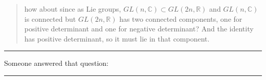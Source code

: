\documentclass{article}
\numberwithin{equation}{subsection} %
\theoremstyle{definition}
\begin{document}
        \begin{quote}
            how about since as Lie groups, $GL(n,\mathbb{C}) 
            \subset GL(2n, \mathbb{R})$ and $GL(n,\mathbb{C})$ is connected 
            but $GL(2n, \mathbb{R})$ has two connected components, one for 
            positive determinant and one for negative determinant? And the 
            identity has positive determinant, so it must lie in that 
            component.
        \end{quote}
        \begin{center}\noindent\rule{8cm}{0.4pt}\end{center}
        
        Someone answered that question: 

        \begin{center}\noindent\rule{8cm}{0.4pt}\end{center}
        
\end{document}

